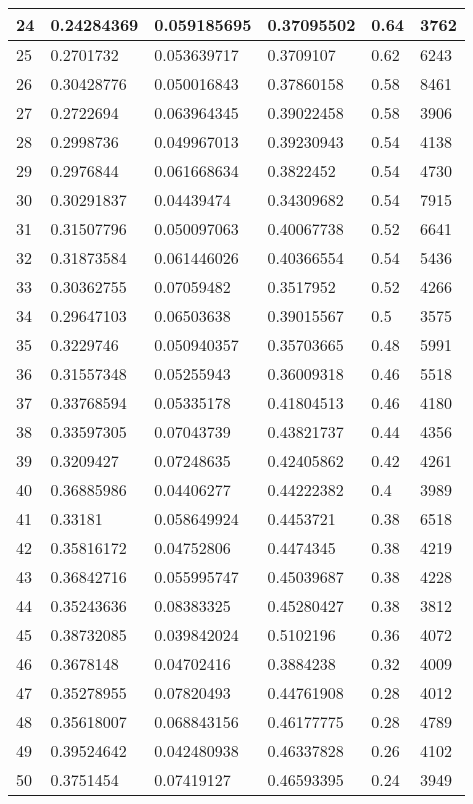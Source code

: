 \begin{longtable}{|l|l|l|l|l|l|}
24 & 0.24284369 & 0.059185695 & 0.37095502 & 0.64 & 3762 \\ \hline 
25 & 0.2701732 & 0.053639717 & 0.3709107 & 0.62 & 6243 \\ \hline 
26 & 0.30428776 & 0.050016843 & 0.37860158 & 0.58 & 8461 \\ \hline 
27 & 0.2722694 & 0.063964345 & 0.39022458 & 0.58 & 3906 \\ \hline 
28 & 0.2998736 & 0.049967013 & 0.39230943 & 0.54 & 4138 \\ \hline 
29 & 0.2976844 & 0.061668634 & 0.3822452 & 0.54 & 4730 \\ \hline 
30 & 0.30291837 & 0.04439474 & 0.34309682 & 0.54 & 7915 \\ \hline 
31 & 0.31507796 & 0.050097063 & 0.40067738 & 0.52 & 6641 \\ \hline 
32 & 0.31873584 & 0.061446026 & 0.40366554 & 0.54 & 5436 \\ \hline 
33 & 0.30362755 & 0.07059482 & 0.3517952 & 0.52 & 4266 \\ \hline 
34 & 0.29647103 & 0.06503638 & 0.39015567 & 0.5 & 3575 \\ \hline 
35 & 0.3229746 & 0.050940357 & 0.35703665 & 0.48 & 5991 \\ \hline 
36 & 0.31557348 & 0.05255943 & 0.36009318 & 0.46 & 5518 \\ \hline 
37 & 0.33768594 & 0.05335178 & 0.41804513 & 0.46 & 4180 \\ \hline 
38 & 0.33597305 & 0.07043739 & 0.43821737 & 0.44 & 4356 \\ \hline 
39 & 0.3209427 & 0.07248635 & 0.42405862 & 0.42 & 4261 \\ \hline 
40 & 0.36885986 & 0.04406277 & 0.44222382 & 0.4 & 3989 \\ \hline 
41 & 0.33181 & 0.058649924 & 0.4453721 & 0.38 & 6518 \\ \hline 
42 & 0.35816172 & 0.04752806 & 0.4474345 & 0.38 & 4219 \\ \hline 
43 & 0.36842716 & 0.055995747 & 0.45039687 & 0.38 & 4228 \\ \hline 
44 & 0.35243636 & 0.08383325 & 0.45280427 & 0.38 & 3812 \\ \hline 
45 & 0.38732085 & 0.039842024 & 0.5102196 & 0.36 & 4072 \\ \hline 
46 & 0.3678148 & 0.04702416 & 0.3884238 & 0.32 & 4009 \\ \hline 
47 & 0.35278955 & 0.07820493 & 0.44761908 & 0.28 & 4012 \\ \hline 
48 & 0.35618007 & 0.068843156 & 0.46177775 & 0.28 & 4789 \\ \hline 
49 & 0.39524642 & 0.042480938 & 0.46337828 & 0.26 & 4102 \\ \hline 
50 & 0.3751454 & 0.07419127 & 0.46593395 & 0.24 & 3949 \\ \hline 
\end{longtable}